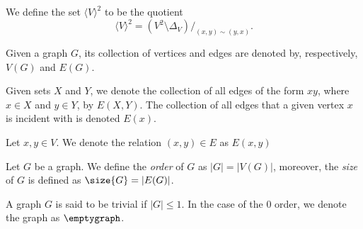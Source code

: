 \begin{definition}
  We define the set \(\langle V \rangle^2\) to be the quotient
  \[
    \langle V \rangle^2 = (V^2 \setminus \Delta_V)/_{(x, y) \sim (y, x)}.
  \]
\end{definition}

\begin{notation}
  Given a graph \(G\), its collection of vertices and edges are denoted by,
  respectively, \(V(G)\) and \(E(G)\).
\end{notation}

\begin{notation}
  Given sets \(X\) and \(Y\), we denote the collection of all edges of the form
  \(xy\), where \(x \in X\) and \(y \in Y\), by \(E(X, Y)\). The collection of
  all edges that a given vertex \(x\) is incident with is denoted \(E(x)\).
\end{notation}

\begin{notation}
  Let \(x, y \in V\). We denote the relation \((x, y) \in E\) as \(E(x, y)\)
\end{notation}

\begin{definition}
  Let \(G\) be a graph. We define the \emph{order} of \(G\) as \(|G| =|V(G)|\),
  moreover, the \emph{size} of \(G\) is defined as \(\size{G} = |E(G)|\).
\end{definition}

\begin{definition}
  A graph \(G\) is said to be trivial if \(|G| \leq 1\). In the case of the
  \(0\) order, we denote the graph as \(\emptygraph\).
\end{definition}
